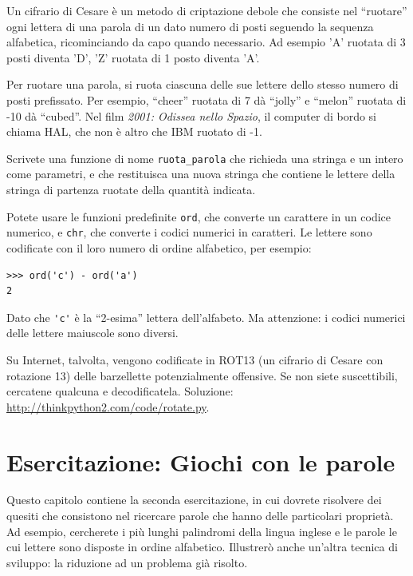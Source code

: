 \documentclass[10pt]{book}
\begin{document}
\vspace{0.2in}
\begin{exercise}


\label{exrotate}
Un cifrario di Cesare è un metodo di criptazione debole che consiste nel ``ruotare'' ogni lettera di una parola di un dato numero di posti seguendo la sequenza alfabetica, ricominciando da capo quando necessario. Ad esempio 'A' ruotata di 3 posti diventa 'D', 'Z' ruotata di 1 posto diventa 'A'.

Per ruotare una parola, si ruota ciascuna delle sue lettere dello stesso numero di posti prefissato.
Per esempio, ``cheer'' ruotata di 7 dà ``jolly'' e ``melon'' ruotata di -10
dà ``cubed''.  Nel film {\em 2001: Odissea nello Spazio}, il computer di bordo si chiama HAL, che non è altro che IBM ruotato di -1.

Scrivete una funzione di nome \verb"ruota_parola" che richieda una stringa e un intero come parametri, e che restituisca una nuova stringa che contiene le lettere della stringa di partenza ruotate della quantità indicata.

Potete usare le funzioni predefinite {\tt ord}, che converte un carattere in un codice numerico, e {\tt chr}, che converte i codici numerici in caratteri.
Le lettere sono codificate con il loro numero di ordine alfabetico, per esempio:

\begin{verbatim}
>>> ord('c') - ord('a')
2
\end{verbatim}

Dato che \verb"'c'" è la ``2-esima'' lettera dell'alfabeto.  Ma attenzione: i codici numerici delle lettere maiuscole sono diversi.

Su Internet, talvolta, vengono codificate in ROT13 (un cifrario di Cesare con rotazione 13) delle barzellette potenzialmente offensive. Se non siete suscettibili, cercatene qualcuna e decodificatela. Soluzione: \url{http://thinkpython2.com/code/rotate.py}.

\end{exercise}


\chapter{Esercitazione: Giochi con le parole}
\label{wordplay}

Questo capitolo contiene la seconda esercitazione, in cui dovrete risolvere dei quesiti che consistono nel ricercare parole che hanno delle particolari proprietà. Ad esempio, cercherete i più lunghi palindromi della lingua inglese e le parole le cui lettere sono disposte in ordine alfabetico. Illustrerò anche un'altra tecnica di sviluppo: la riduzione ad un problema già risolto.
\end{document}
